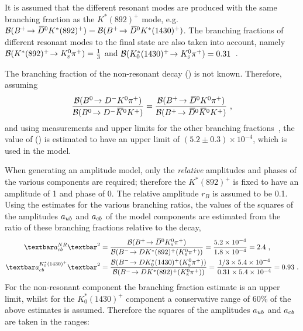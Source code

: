 It is assumed that the different resonant \Kstarp modes are produced with the same branching fraction as the $K^*(892)^+$ mode, e.g. ${\mathcal{B}}({{{B}^+}}\!\rightarrow {\ensuremath{{\kern 0.2em\overline{\kern -0.2em D}{}}{}^0}} K^*(892)^+) = {\mathcal{B}}({{{B}^+}}\!\rightarrow {\ensuremath{{\kern 0.2em\overline{\kern -0.2em D}{}}{}^0}} K^*(1430)^+)$. The branching fractions of different resonant \Kstarp modes to the \KS\pip final state are also taken into account, namely ${\mathcal{B}}(K^*(892)^+\!\rightarrow {\ensuremath{{K}^0_{\mathrm{ \scriptscriptstyle S}}}}{\ensuremath{{\pi}^+}}) = \frac{1}{3}$ and ${\mathcal{B}}(K^*_0(1430)^+\!\rightarrow {\ensuremath{{K}^0_{\mathrm{ \scriptscriptstyle S}}}}{\ensuremath{{\pi}^+}}) = 0.31$~\cite{PDG2016}.

The branching fraction of the non-resonant decay \BR(\decay{\Bp}{\Dzb\KS\pip}) is not known. Therefore, assuming
\begin{equation*}
\frac{{\mathcal{B}}({{B}^0}\!\rightarrow {\ensuremath{{D}^-}}{\ensuremath{{K}^0}}{\ensuremath{{\pi}^+}})}{{\mathcal{B}}({{B}^0}\!\rightarrow {\ensuremath{{D}^-}}{\ensuremath{{\kern 0.2em\overline{\kern -0.2em K}{}}{}^0}}{\ensuremath{{K}^+}})} = \frac{{\mathcal{B}}({{{B}^+}}\!\rightarrow {\ensuremath{{\kern 0.2em\overline{\kern -0.2em D}{}}{}^0}}{\ensuremath{{K}^0}}{\ensuremath{{\pi}^+}})}{{\mathcal{B}}({{{B}^+}}\!\rightarrow {\ensuremath{{\kern 0.2em\overline{\kern -0.2em D}{}}{}^0}}{\ensuremath{{\kern 0.2em\overline{\kern -0.2em K}{}}{}^0}}{\ensuremath{{K}^+}})} \text{ ,}
\end{equation*}
and using measurements and upper limits for the other branching fractions~\cite{PDG2016}, the value of \BR(\decay{\Bp}{\Dzb\KS\pip}) is estimated to have an upper limit of $(5.2 \pm 0.3) \times 10^{-4}$, which is used in the model.

When generating an amplitude model, only the \textit{relative} amplitudes and phases of the various components are required; therefore the $K^*(892)^+$ is fixed to have an amplitude of 1 and phase of 0. The relative amplitude $r_B$ is assumed to be 0.1. Using the estimates for the various branching ratios, the values of the squares of the amplitudes $a_{{u}{b}}$ and $a_{{c}{b}}$ of the model components are estimated from the ratio of these branching fractions relative to the  decay,
\begin{align*}
\textbar a_{\cquark\bquark}^{NR}\textbar^2 &= \frac{\BR(\decay{\Bp}{\Dzb\KS\pip})}{\BR(\decay{\Bm}{\D K^*(892)^+(\KS\pip)})} = \frac{5.2 \times 10^{-4}}{1.8 \times 10^{-4}} = 2.4 \text{ ,} \\
\textbar a_{\cquark\bquark}^{K^*_0(1430)^+}\textbar^2 &= \frac{\BR(\decay{\Bm}{\D K^*_0(1430)^+(\KS\pip)})}{\BR(\decay{\Bm}{\D K^*(892)^+(\KS\pip)})} = \frac{1/3 \times 5.4 \times 10^{-4}}{0.31 \times 5.4 \times 10^{-4}} = 0.93 \text{ .}
\end{align*}
For the non-resonant component the branching fraction estimate is an upper limit, whilst for the $K^*_0(1430)^+$  component a conservative range of 60\% of the above estimates is assumed. Therefore the squares of the amplitudes $a_{{u}{b}}$ and $a_{{c}{b}}$ are taken in the ranges:


